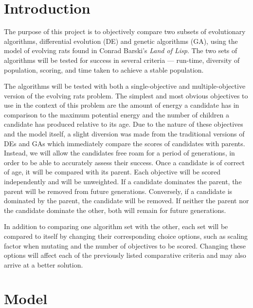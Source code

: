 \documentclass{sig-alternate}
\begin{document}
\section{Introduction}
\label{sec:Introduction}
The purpose of this project is to objectively compare two subsets of evolutionary algorithms, differential evolution (DE) and genetic algorithms (GA), using the model of evolving rats found in Conrad Barski's \emph{Land of Lisp}.  The two sets of algorithms will be tested for success in several criteria --- run-time, diversity of population, scoring, and time taken to achieve a stable population.

The algorithms will be tested with both a single-objective and multiple-objective version of the evolving rats problem.  The simplest and most obvious objectives to use in the context of this problem are the amount of energy a candidate has in comparison to the maximum potential energy and the number of children a candidate has produced relative to its age.  Due to the nature of these objectives and the model itself, a slight diversion was made from the traditional versions of DEs and GAs which immediately compare the scores of candidates with parents.  Instead, we will allow the candidates free roam for a period of generations, in order to be able to accurately assess their success.  Once a candidate is of correct of age, it will be compared with its parent.  Each objective will be scored independently and will be unweighted.  If a candidate dominates the parent, the parent will be removed from future generations.  Conversely, if a candidate is dominated by the parent, the candidate will be removed.  If neither the parent nor the candidate dominate the other, both will remain for future generations.

In addition to comparing one algorithm set with the other, each set will be compared to itself by changing their corresponding choice options, such as scaling factor when mutating and the number of objectives to be scored.  Changing these options will affect each of the previously listed comparative criteria and may also arrive at a better solution.

\section{Model}
\label{sec:Model}
\end{document}
